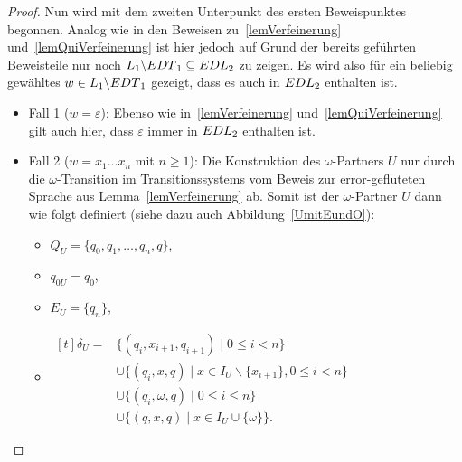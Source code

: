 \begin{proof}
  Nun wird mit dem zweiten Unterpunkt des ersten Beweispunktes begonnen. Analog
  wie in den Beweisen zu~\ref{lemVerfeinerung} und~\ref{lemQuiVerfeinerung} ist
  hier jedoch auf Grund der bereits geführten Beweisteile nur noch
  $L_1\backslash EDT{}_1\subseteq EDL{}_2$ zu zeigen. Es wird also für ein
  beliebig gewähltes $w\in L_1\backslash EDT{}_1$ gezeigt, dass es auch in
  $EDL{}_2$ enthalten ist.
  \begin{itemize}
    \item Fall 1 ($w=\varepsilon$): Ebenso wie in~\ref{lemVerfeinerung}
      und~\ref{lemQuiVerfeinerung} gilt auch hier, dass $\varepsilon$ immer in
      $EDL{}_2$ enthalten ist.
    \item Fall 2 ($w=x_1\dots x_n$ mit $n\geq 1$): Die Konstruktion des
      $\omega$-Partners $U$ nur durch die $\omega$-Transition im
      Transitionssystems vom Beweis zur error-gefluteten Sprache \EL{} aus
      Lemma~\ref{lemVerfeinerung} ab. Somit ist der $\omega$-Partner $U$ dann
      wie folgt definiert (siehe dazu auch Abbildung~\ref{UmitEundO}):
      \begin{itemize}
        \item $Q_U=\{q_0,q_1,\dots ,q_n,q\}$,
        \item $q_{0U}=q_0$,
        \item $E_U=\{q_n\}$,
        \item $\begin{aligned}[t]
            \delta _U=&\{(q_i,x_{i+1},q_{i+1})\mid 0\leq i< n\}\\
                      &\cup\{(q_i,x,q)\mid x\in I_U\backslash\{x_{i+1}\},0\leq
          i < n\}\\
          &\cup\{(q_i,\omega ,q)\mid 0\leq i\leq n\}\\
          &\cup\{(q,x ,q)\mid x\in I_U\cup \{\omega\}\}.
              \end{aligned}$
      \end{itemize}
      \begin{figure} [h!tbp]
      \begin{center}
\end{center}
\end{figure}
\end{itemize}
\end{proof}
